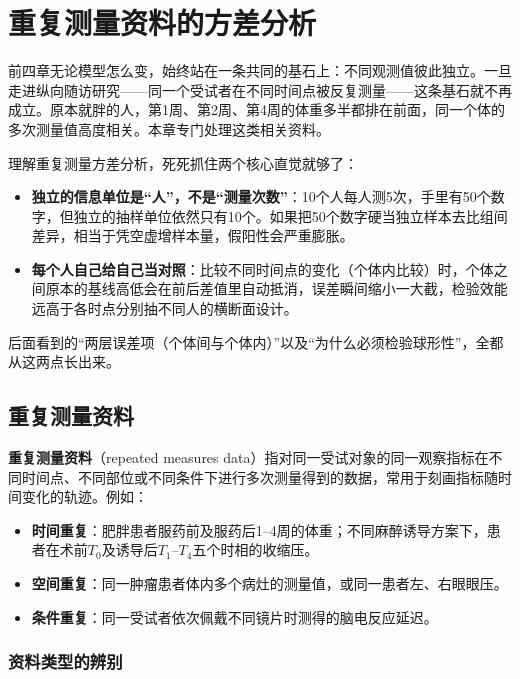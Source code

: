 \chapter{重复测量资料的方差分析}
前四章无论模型怎么变，始终站在一条共同的基石上：不同观测值彼此独立。一旦走进纵向随访研究——同一个受试者在不同时间点被反复测量——这条基石就不再成立。原本就胖的人，第1周、第2周、第4周的体重多半都排在前面，同一个体的多次测量值高度相关。本章专门处理这类相关资料。

理解重复测量方差分析，死死抓住两个核心直觉就够了：
\begin{itemize}
\item \textbf{独立的信息单位是“人”，不是“测量次数”}：10个人每人测5次，手里有50个数字，但独立的抽样单位依然只有10个。如果把50个数字硬当独立样本去比组间差异，相当于凭空虚增样本量，假阳性会严重膨胀。
\item \textbf{每个人自己给自己当对照}：比较不同时间点的变化（个体内比较）时，个体之间原本的基线高低会在前后差值里自动抵消，误差瞬间缩小一大截，检验效能远高于各时点分别抽不同人的横断面设计。
\end{itemize}
后面看到的“两层误差项（个体间与个体内）”以及“为什么必须检验球形性”，全都从这两点长出来。

\section{重复测量资料}
\textbf{重复测量资料}（repeated measures data）指对同一受试对象的同一观察指标在不同时间点、不同部位或不同条件下进行多次测量得到的数据，常用于刻画指标随时间变化的轨迹。例如：
\begin{itemize}
\item \textbf{时间重复}：肥胖患者服药前及服药后1--4周的体重；不同麻醉诱导方案下，患者在术前$T_0$及诱导后$T_1$--$T_4$五个时相的收缩压。
\item \textbf{空间重复}：同一肿瘤患者体内多个病灶的测量值，或同一患者左、右眼眼压。
\item \textbf{条件重复}：同一受试者依次佩戴不同镜片时测得的脑电反应延迟。
\end{itemize}

\subsection{资料类型的辨别}

